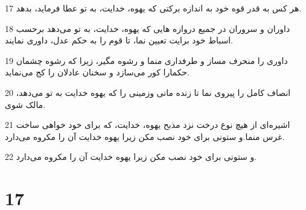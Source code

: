 \par 17 هر کس به قدر قوه خود به اندازه برکتی که یهوه، خدایت، به تو عطا فرماید، بدهد.
\par 18 داوران و سروران در جمیع دروازه هایی که یهوه، خدایت، به تو می‌دهد برحسب اسباط خود برایت تعیین نما، تا قوم را به حکم عدل، داوری نمایند.
\par 19 داوری را منحرف مساز و طرفداری منما و رشوه مگیر، زیرا که رشوه چشمان حکمارا کور می‌سازد و سخنان عادلان را کج می‌نماید.
\par 20 انصاف کامل را پیروی نما تا زنده مانی وزمینی را که یهوه خدایت به تو می‌دهد، مالک شوی.
\par 21 اشیره‌ای از هیچ نوع درخت نزد مذبح یهوه، خدایت، که برای خود خواهی ساخت غرس منما.و ستونی برای خود نصب مکن زیرا یهوه خدایت آن را مکروه می‌دارد.
\par 22 و ستونی برای خود نصب مکن زیرا یهوه خدایت آن را مکروه می‌دارد.
 
\chapter{17}

